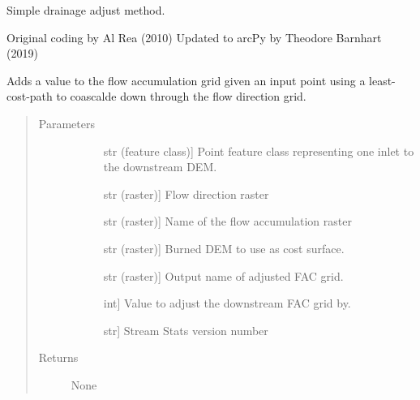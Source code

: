 \documentclass[letterpaper,10pt,english]{sphinxmanual}
\begin{document}
\begin{fulllineitems}
\label{\detokenize{make_hydrodem:make_hydrodem.adjust_accum_simple}}
Simple drainage adjust method.

Original coding by Al Rea (2010) 
Updated to arcPy by Theodore Barnhart (2019) 

Adds a value to the flow accumulation grid given an input point using a least-cost-path to coascalde down through the flow direction grid.
\begin{quote}\begin{description}
\item[{Parameters}] \leavevmode\begin{description}
\item[{}] \leavevmode{[}str (feature class){]}
Point feature class representing one inlet to the downstream DEM.

\item[{}] \leavevmode{[}str (raster){]}
Flow direction raster

\item[{}] \leavevmode{[}str (raster){]}
Name of the flow accumulation raster

\item[{}] \leavevmode{[}str (raster){]}
Burned DEM to use as cost surface.

\item[{}] \leavevmode{[}str (raster){]}
Output name of adjusted FAC grid.

\item[{}] \leavevmode{[}int{]}
Value to adjust the downstream FAC grid by.

\item[{}] \leavevmode{[}str{]}
Stream Stats version number

\end{description}

\item[{Returns}] \leavevmode\begin{description}
\item[{None}] \leavevmode
\end{description}

\end{description}\end{quote}

\end{fulllineitems}
\end{document}
